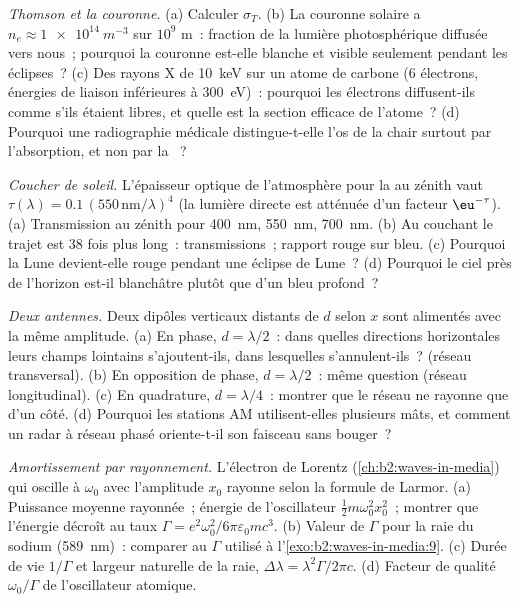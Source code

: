 \begin{exercise}[$\star\star$]\label{exo:b2:dipole-radiation:7}
\emph{Thomson et la couronne.} (a) Calculer $\sigma_T$. (b) La couronne solaire
a $n_e \approx \qty{1e14}{m^{-3}}$ sur $10^9$ m~: fraction de la lumière photosphérique
diffusée vers nous~; pourquoi la couronne est-elle blanche et visible seulement
pendant les éclipses~? (c) Des rayons X de \qty{10}{keV} sur un atome de carbone ($6$
électrons, énergies de liaison inférieures à \qty{300}{eV})~: pourquoi les électrons
diffusent-ils comme s'ils étaient libres, et quelle est la section efficace de l'atome~? (d) Pourquoi
une radiographie médicale distingue-t-elle l'os de la chair surtout par
l'absorption, et non par la ~?
\end{exercise}

\begin{exercise}[$\star\star$]\label{exo:b2:dipole-radiation:8}
\emph{Coucher de soleil.} L'épaisseur optique de l'atmosphère pour la  au zénith vaut $\tau(\lambda) = 0.1\,(550\,\text{nm}/\lambda)^4$ (la
lumière directe est atténuée d'un facteur $\eu^{-\tau}$). (a) Transmission au
zénith pour \qty{400}{nm}, \qty{550}{nm}, \qty{700}{nm}. (b) Au couchant le trajet
est $38$ fois plus long~: transmissions~; rapport rouge sur bleu. (c) Pourquoi la
Lune devient-elle rouge pendant une éclipse de Lune~? (d) Pourquoi le ciel près de
l'horizon est-il blanchâtre plutôt que d'un bleu profond~?
\end{exercise}

\begin{exercise}[$\star\star$]\label{exo:b2:dipole-radiation:9}
\emph{Deux antennes.} Deux dipôles verticaux distants de $d$ selon
$x$ sont alimentés avec la même amplitude. (a) En phase, $d = \lambda/2$~: dans quelles
directions horizontales leurs champs lointains s'ajoutent-ils, dans lesquelles s'annulent-ils~?
(réseau transversal). (b) En opposition de phase, $d = \lambda/2$~: même question (réseau longitudinal).
(c) En quadrature, $d = \lambda/4$~: montrer que le réseau ne rayonne que d'un
côté. (d) Pourquoi les stations AM utilisent-elles plusieurs mâts, et
comment un radar à réseau phasé oriente-t-il son faisceau sans bouger~?
\end{exercise}

\begin{exercise}[$\star\star\star$]\label{exo:b2:dipole-radiation:10}
\emph{Amortissement par rayonnement.} L'électron de Lorentz (\cref{ch:b2:waves-in-media})
qui oscille à $\omega_0$ avec l'amplitude $x_0$ rayonne selon la formule de Larmor.
(a) Puissance moyenne rayonnée~; énergie de l'oscillateur $\tfrac12m\omega_0^2x_0^2$~;
montrer que l'énergie décroît au taux $\Gamma = e^2\omega_0^2/6\pi\varepsilon_0mc^3$.
(b) Valeur de $\Gamma$ pour la raie du sodium (\qty{589}{nm})~: comparer au
$\Gamma$ utilisé à l'\cref{exo:b2:waves-in-media:9}. (c) Durée de vie $1/\Gamma$ et
largeur naturelle de la raie, $\Delta\lambda = \lambda^2\Gamma/2\pi c$. (d) Facteur de qualité
$\omega_0/\Gamma$ de l'oscillateur atomique.
\end{exercise}

